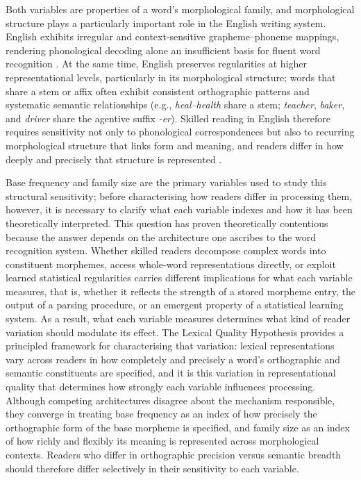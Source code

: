 Both variables are properties of a word's morphological family, and morphological structure plays a particularly important role in the English writing system. English exhibits irregular and context-sensitive grapheme–phoneme mappings, rendering phonological decoding alone an insufficient basis for fluent word recognition \citep{zieglerReadingAcquisitionDevelopmental2005, castlesHowDoesOrthographic2006}. At the same time, English preserves regularities at higher representational levels, particularly in its morphological structure; words that share a stem or affix often exhibit consistent orthographic patterns and systematic semantic relationships (e.g., \textit{heal–health} share a stem; \textit{teacher}, \textit{baker}, and \textit{driver} share the agentive suffix \textit{-er}). Skilled reading in English therefore requires sensitivity not only to phonological correspondences but also to recurring morphological structure that links form and meaning, and readers differ in how deeply and precisely that structure is represented \citep{bryantMorphologySpellingWhat2005, arciuliReadingStatisticalLearning2018, treimanStatisticalLearningSpelling2018}.

Base frequency and family size are the primary variables used to study this structural sensitivity; before characterising how readers differ in processing them, however, it is necessary to clarify what each variable indexes and how it has been theoretically interpreted. This question has proven theoretically contentious because the answer depends on the architecture one ascribes to the word recognition system. Whether skilled readers decompose complex words into constituent morphemes, access whole-word representations directly, or exploit learned statistical regularities carries different implications for what each variable measures, that is, whether it reflects the strength of a stored morpheme entry, the output of a parsing procedure, or an emergent property of a statistical learning system. As a result, what each variable measures determines what kind of reader variation should modulate its effect. The Lexical Quality Hypothesis \citep{perfettiLexicalQualityHypothesis2002, perfettiReadingAbilityLexical2007, perfettiLexicalQualityRevisited2017} provides a principled framework for characterising that variation: lexical representations vary across readers in how completely and precisely a word's orthographic and semantic constituents are specified, and it is this variation in representational quality that determines how strongly each variable influences processing. Although competing architectures disagree about the mechanism responsible, they converge in treating base frequency as an index of how precisely the orthographic form of the base morpheme is specified, and family size as an index of how richly and flexibly its meaning is represented across morphological contexts. Readers who differ in orthographic precision versus semantic breadth should therefore differ selectively in their sensitivity to each variable.


